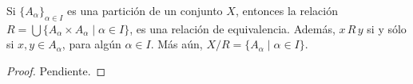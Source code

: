 

\begin{theorem}
Si $\{ A_{\alpha} \}_{\alpha \in I}$ es una partición de un conjunto $X$, entonces la relación $R = \bigcup \{ A_{\alpha} \times A_{\alpha} \mid \alpha \in I \}$, es una relación de equivalencia. Además, $x \, R \, y$ si y sólo si $x, y \in A_{\alpha}$, para algún $\alpha \in I$. Más aún, $X/R = \{ A_{\alpha} \mid \alpha \in I \}$.
\end{theorem}

\begin{proof}
Pendiente.
\end{proof}
